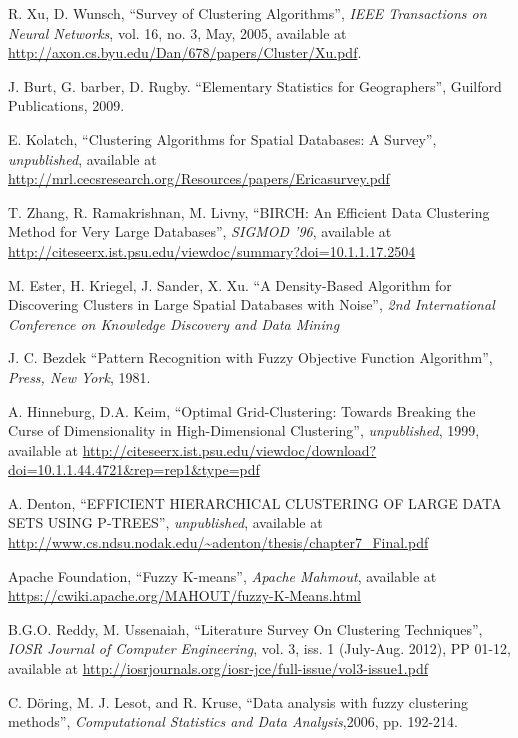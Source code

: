\documentclass[conference, 10pt]{IEEEtran}
\begin{document}
\newpage
\begin{thebibliography}{1}

 R. Xu, D. Wunsch, ``Survey of Clustering Algorithms'', \emph{IEEE Transactions on Neural Networks}, vol. 16, no. 3, May, 2005, available at 
\url{http://axon.cs.byu.edu/Dan/678/papers/Cluster/Xu.pdf}.

 J. Burt, G. barber, D. Rugby.  ``Elementary Statistics for Geographers'', Guilford Publications, 2009.

 E. Kolatch, ``Clustering Algorithms for Spatial Databases: A Survey'', \emph{unpublished}, available at
\url{http://mrl.cecsresearch.org/Resources/papers/Ericasurvey.pdf}

 T. Zhang, R. Ramakrishnan, M. Livny, ``BIRCH: An Efficient Data Clustering Method for Very Large Databases'', \emph{SIGMOD ’96}, available at
\url{http://citeseerx.ist.psu.edu/viewdoc/summary?doi=10.1.1.17.2504}

 M. Ester, H. Kriegel, J. Sander, X. Xu. ``A Density-Based Algorithm for Discovering Clusters in Large Spatial Databases with Noise'', \emph{2nd International Conference on Knowledge Discovery and Data Mining}

 J. C. Bezdek ``Pattern Recognition with Fuzzy Objective Function Algorithm'', \emph{Press, New York}, 1981.

 A. Hinneburg, D.A. Keim, ``Optimal Grid-Clustering: Towards Breaking the Curse of Dimensionality in High-Dimensional Clustering'', \emph{unpublished}, 1999, available at
\url{http://citeseerx.ist.psu.edu/viewdoc/download?doi=10.1.1.44.4721&rep=rep1&type=pdf} 

 A. Denton, ``EFFICIENT HIERARCHICAL CLUSTERING OF LARGE DATA SETS USING P-TREES'', \emph{unpublished}, available at
\url{http://www.cs.ndsu.nodak.edu/~adenton/thesis/chapter7_Final.pdf}

 Apache Foundation, ``Fuzzy K-means'', \emph{Apache Mahmout}, available at
\url{https://cwiki.apache.org/MAHOUT/fuzzy-K-Means.html}

 B.G.O. Reddy, M. Ussenaiah, ``Literature Survey On Clustering Techniques'', \emph{IOSR Journal of Computer Engineering}, vol. 3, iss. 1 (July-Aug. 2012), PP 01-12, available at
\url{http://iosrjournals.org/iosr-jce/full-issue/vol3-issue1.pdf}

 C. Döring, M. J. Lesot, and R. Kruse, ``Data analysis with fuzzy clustering methods'', \emph{Computational Statistics and Data Analysis},2006, pp. 192-214.


\end{thebibliography}
\end{document}
